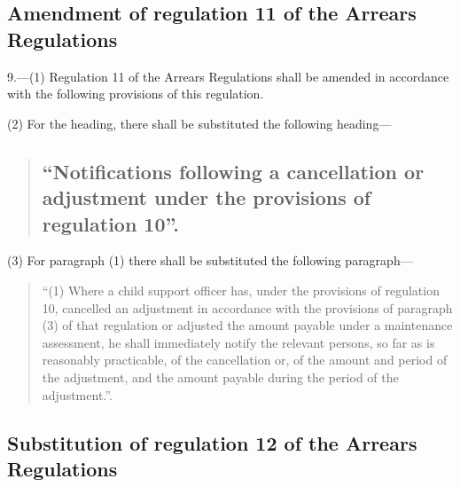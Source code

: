 \documentclass[12pt,a4paper]{article}
\begin{document}
\subsection[9. Amendment of regulation 11 of the Arrears Regulations]{Amendment of regulation 11 of the Arrears Regulations}

9.—(1) Regulation 11 of the Arrears Regulations shall be amended in accordance with the following provisions of this regulation.

(2) For the heading, there shall be substituted the following heading—
\begin{quotation}
\subsection*{“Notifications following a cancellation or adjustment under the provisions of regulation 10”.} {}
\end{quotation}

(3) For paragraph (1) there shall be substituted the following paragraph—

\begin{quotation}
“(1) Where a child support officer has, under the provisions of regulation 10, cancelled an adjustment in accordance with the provisions of paragraph (3) of that regulation or adjusted the amount payable under a maintenance assessment, he shall immediately notify the relevant persons, so far as is reasonably practicable, of the cancellation or, of the amount and period of the adjustment, and the amount payable during the period of the adjustment.”.
\end{quotation}

\subsection[10. Substitution of regulation 12 of the Arrears Regulations]{Substitution of regulation 12 of the Arrears Regulations}
\end{document}
